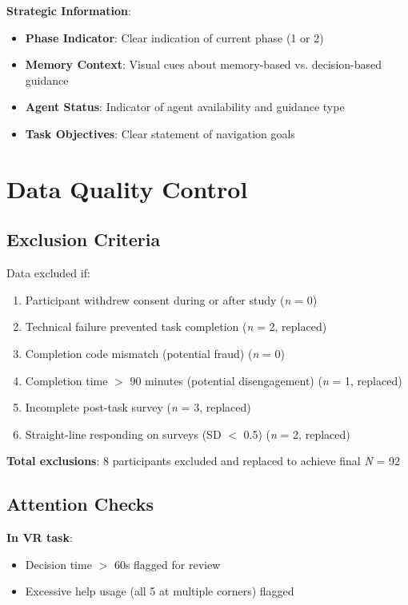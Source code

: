\documentclass[12pt]{article}
\begin{document}
\textbf{Strategic Information}:
\begin{itemize}
    \item \textbf{Phase Indicator}: Clear indication of current phase (1 or 2)
    \item \textbf{Memory Context}: Visual cues about memory-based vs. decision-based guidance
    \item \textbf{Agent Status}: Indicator of agent availability and guidance type
    \item \textbf{Task Objectives}: Clear statement of navigation goals
\end{itemize}

\section{Data Quality Control}

\subsection{Exclusion Criteria}

Data excluded if:
\begin{enumerate}
    \item Participant withdrew consent during or after study (\textit{n} = 0)
    \item Technical failure prevented task completion (\textit{n} = 2, replaced)
    \item Completion code mismatch (potential fraud) (\textit{n} = 0)
    \item Completion time $>$ 90 minutes (potential disengagement) (\textit{n} = 1, replaced)
    \item Incomplete post-task survey (\textit{n} = 3, replaced)
    \item Straight-line responding on surveys (SD $<$ 0.5) (\textit{n} = 2, replaced)
\end{enumerate}

\textbf{Total exclusions}: 8 participants excluded and replaced to achieve final \textit{N} = 92

\subsection{Attention Checks}

\textbf{In VR task}:
\begin{itemize}
    \item Decision time $>$ 60s flagged for review
    \item Excessive help usage (all 5 at multiple corners) flagged
\end{itemize}
\end{document}
